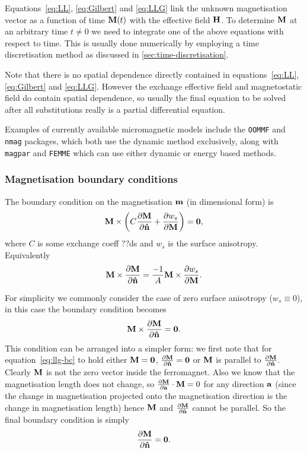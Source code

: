Equations~\eqref{eq:LL}, \eqref{eq:Gilbert} and \eqref{eq:LLG} link the unknown magnetisation vector as a function of time $\mathbf{M}(t)$ with the effective field $\mathbf{H}$. To determine $\mathbf{M}$ at an arbitrary time $t \neq 0$ we need to integrate one of the above equations with respect to time. This is usually done numerically by employing a time discretisation method as discussed in \autoref{sec:time-discretisation}.

Note that there is no spatial dependence directly contained in equations~\eqref{eq:LL}, \eqref{eq:Gilbert} and \eqref{eq:LLG}. However the exchange effective field and magnetostatic field do contain spatial dependence, so usually the final equation to be solved after all substitutions really is a partial differential equation.

Examples of currently available micromagnetic models include the \texttt{OOMMF}\cite{oommf-website} and \texttt{nmag}\cite{Fischbacher2007} packages, which both use the dynamic method exclusively, along with \texttt{magpar}\cite{Scholz2003} and \texttt{FEMME}\cite{suessco-website} which can use either dynamic or energy based methods.


\subsubsection{Magnetisation boundary conditions}
\label{sec:magn-bound-cond}

The boundary condition on the magnetisation $\mathbf{m}$ (in dimensional form) is \cite[pgs. 178, 181]{Aharoni1996}
\begin{equation}
  \mathbf{M} \times {\left(  C \frac{\partial \mathbf{M}}{\partial \mathbf{\hat{n}}}+ \frac{\partial w_s}{\partial \mathbf{M}} \right)} = \mathbf{0},
\end{equation}
where $C$ is some exchange coeff ??ds and $w_s$ is the surface anisotropy.
Equivalently
\begin{equation}
    \mathbf{M} \times \frac{\partial \mathbf{M}}{\partial \mathbf{\hat{n}}} = \frac{-1}{A} \mathbf{M} \times \frac{\partial w_s}{\partial \mathbf{M}}.
\end{equation}

For simplicity we commonly consider the case of zero surface anisotropy ($w_s \equiv 0$), in this case the boundary condition becomes
\begin{equation}
  \label{eq:llg-bc}
  \mathbf{M} \times \frac{\partial \mathbf{M}}{\partial \mathbf{\hat{n}}} = \mathbf{0}.
\end{equation}
This condition can be arranged into a simpler form: we first note that for equation~\eqref{eq:llg-bc} to hold either $\mathbf{M} = \mathbf{0}$, $\frac{\partial \mathbf{M}}{\partial \mathbf{\hat{n}}} = \mathbf{0}$ or $\mathbf{M}$ is parallel to $\frac{\partial \mathbf{M}}{\partial \mathbf{\hat{n}}}$.
Clearly $\mathbf{M}$ is not the zero vector inside the ferromagnet.
Also we know that the magnetisation length does not change, so $\frac{\partial \mathbf{M}}{\partial {\mathbf{a}}} \cdot \mathbf{M} = 0$ for any direction ${\mathbf{a}}$ (since the change in magnetisation projected onto the magnetisation direction is the change in magnetisation length) hence $\mathbf{M}$ and $\frac{\partial \mathbf{M}}{\partial \mathbf{\hat{n}}}$ cannot be parallel.
So the final boundary condition is simply
\begin{equation}
  \frac{\partial \mathbf{M}}{\partial \mathbf{\hat{n}}} = \mathbf{0}.
\end{equation}


